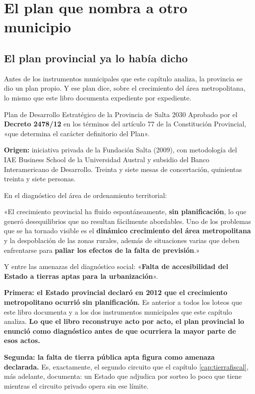 \chapter{El plan que nombra a otro municipio}

\label{cap:pdua}
\section{El plan provincial ya lo había dicho}

Antes de los instrumentos municipales que este capítulo analiza, la provincia se dio un plan
propio. Y ese plan dice, sobre el crecimiento del área metropolitana, lo mismo que este libro
documenta expediente por expediente.

\begin{ficha}{Plan de Desarrollo Estratégico de la Provincia de Salta 2030}
Aprobado por el \textbf{Decreto 2478/12} en los términos del artículo 77 de la Constitución
Provincial, «que determina el carácter definitorio del Plan».

\textbf{Origen:} iniciativa privada de la Fundación Salta (2009), con metodología del IAE
Business School de la Universidad Austral y subsidio del Banco Interamericano de Desarrollo.
Treinta y siete mesas de concertación, quinientas treinta y siete personas.

En el diagnóstico del área de ordenamiento territorial:

«El crecimiento provincial ha fluido espontáneamente, \textbf{sin planificación}, lo que generó
desequilibrios que no resultan fácilmente abordables. Uno de los problemas que se ha tornado
visible es el \textbf{dinámico crecimiento del área metropolitana} y la despoblación de las
zonas rurales, además de situaciones varias que deben enfrentarse para \textbf{paliar los
efectos de la falta de previsión}.»

Y entre las amenazas del diagnóstico social: «\textbf{Falta de accesibilidad del Estado a
tierras aptas para la urbanización}».
\end{ficha}

\textbf{Primera: el Estado provincial declaró en 2012 que el crecimiento metropolitano ocurrió
sin planificación.} Es anterior a todos los loteos que este libro documenta y a los dos
instrumentos municipales que este capítulo analiza. \textbf{Lo que el libro reconstruye acto
por acto, el plan provincial lo enunció como diagnóstico antes de que ocurriera la mayor parte
de esos actos.}

\textbf{Segunda: la falta de tierra pública apta figura como amenaza declarada.} Es,
exactamente, el segundo circuito que el capítulo \ref{cap:tierrafiscal}, más adelante, documenta: un Estado que adjudica por
sorteo lo poco que tiene mientras el circuito privado opera sin ese límite.

